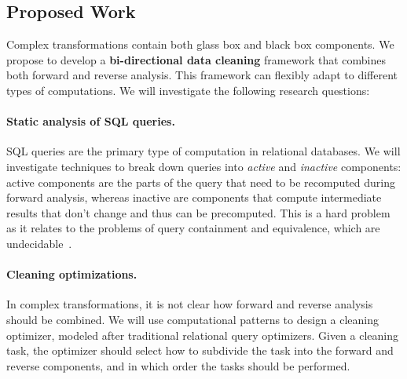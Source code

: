 




\subsection{Proposed Work} %
\label{sub:research_plan}

Complex transformations contain both glass box and black box
components. We propose to develop a \textbf{bi-directional data
  cleaning} framework that combines both forward and reverse
analysis. This framework can flexibly adapt to different types of
computations. We will investigate the following research questions:

\paragraph{Static analysis of SQL queries.} %
\label{par:static_analysis_of_sql_queries}
SQL queries are the primary type of computation in relational databases. We will investigate techniques to break down queries into \emph{active} and \emph{inactive} components: active components are the parts of the query that need to be recomputed during forward analysis, whereas inactive are components that compute intermediate results that don't change and thus can be precomputed. This is a hard problem as it relates to the problems of query containment and equivalence, which are undecidable~\cite{abiteboul1994foundations,DBLP:conf/pods/CalvaneseGL98}.

\paragraph{Cleaning optimizations.} %
\label{par:cleaning_optimizations}
In complex transformations, it is not clear how forward and reverse analysis
should be combined. We will use computational patterns to design a cleaning
optimizer, modeled after traditional relational query optimizers. Given a
cleaning task, the optimizer should select how to subdivide the task into the
forward and reverse components, and in which order the tasks should be
performed.

